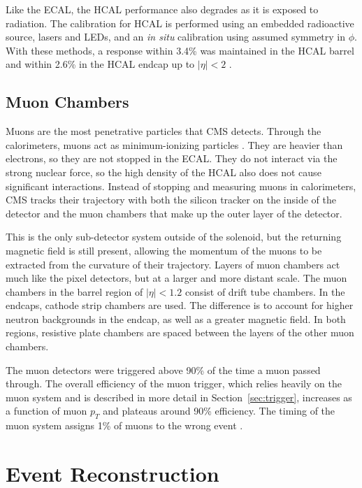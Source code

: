 Like the ECAL, the HCAL performance also degrades as it is exposed to radiation.
The calibration for HCAL is performed using an embedded radioactive source,
lasers and LEDs, and an \emph{in situ} calibration using assumed symmetry in $\phi$.
With these methods, a response within 3.4\% was maintained in the HCAL barrel
and within 2.6\% in the HCAL endcap up to $|\eta| < 2$ \cite{Chadeeva_2018}.

\subsection{Muon Chambers}

Muons are the most penetrative particles that CMS detects.
Through the calorimeters, muons act as minimum-ionizing particles \cite{James:927392}.
They are heavier than electrons, so they are not stopped in the ECAL.
They do not interact via the strong nuclear force,
so the high density of the HCAL also does not cause significant interactions.
Instead of stopping and measuring muons in calorimeters,
CMS tracks their trajectory with both the silicon tracker on the inside of the detector
and the muon chambers that make up the outer layer of the detector.

This is the only sub-detector system outside of the solenoid,
but the returning magnetic field is still present,
allowing the momentum of the muons to be extracted from the curvature of their trajectory.
Layers of muon chambers act much like the pixel detectors,
but at a larger and more distant scale.
The muon chambers in the barrel region of $|\eta| < 1.2$ consist of drift tube chambers.
In the endcaps, cathode strip chambers are used.
The difference is to account for higher neutron backgrounds in the endcap,
as well as a greater magnetic field.
In both regions, resistive plate chambers are spaced
between the layers of the other muon chambers.

The muon detectors were triggered above 90\% of the time a muon passed through.
The overall efficiency of the muon trigger, which relies heavily on the muon system
and is described in more detail in Section~\ref{sec:trigger},
increases as a function of muon $p_T$ and plateaus around 90\% efficiency.
The timing of the muon system assigns 1\% of muons to the wrong event \cite{Pozzobon_2019}.

\section{Event Reconstruction} \label{sec:event-reco}

